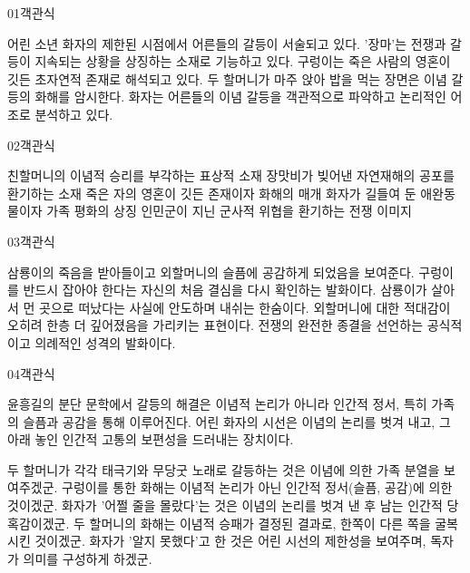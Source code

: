 \documentclass[fs85,seriesWit]{korfarm-base}
\begin{document}
\kfBeginMC
\begin{kfQBlock}{01}{객관식}
\begin{kfChoices}
\kfChoice 어린 소년 화자의 제한된 시점에서 어른들의 갈등이 서술되고 있다.
\kfChoice '장마'는 전쟁과 갈등이 지속되는 상황을 상징하는 소재로 기능하고 있다.
\kfChoice 구렁이는 죽은 사람의 영혼이 깃든 초자연적 존재로 해석되고 있다.
\kfChoice 두 할머니가 마주 앉아 밥을 먹는 장면은 이념 갈등의 화해를 암시한다.
\kfChoice 화자는 어른들의 이념 갈등을 객관적으로 파악하고 논리적인 어조로 분석하고 있다.
\end{kfChoices}
\end{kfQBlock}

\begin{kfQBlock}{02}{객관식}
\begin{kfChoices}
\kfChoice 친할머니의 이념적 승리를 부각하는 표상적 소재
\kfChoice 장맛비가 빚어낸 자연재해의 공포를 환기하는 소재
\kfChoice 죽은 자의 영혼이 깃든 존재이자 화해의 매개
\kfChoice 화자가 길들여 둔 애완동물이자 가족 평화의 상징
\kfChoice 인민군이 지닌 군사적 위협을 환기하는 전쟁 이미지
\end{kfChoices}
\end{kfQBlock}

\begin{kfQBlock}{03}{객관식}
\begin{kfChoices}
\kfChoice 삼룡이의 죽음을 받아들이고 외할머니의 슬픔에 공감하게 되었음을 보여준다.
\kfChoice 구렁이를 반드시 잡아야 한다는 자신의 처음 결심을 다시 확인하는 발화이다.
\kfChoice 삼룡이가 살아서 먼 곳으로 떠났다는 사실에 안도하며 내쉬는 한숨이다.
\kfChoice 외할머니에 대한 적대감이 오히려 한층 더 깊어졌음을 가리키는 표현이다.
\kfChoice 전쟁의 완전한 종결을 선언하는 공식적이고 의례적인 성격의 발화이다.
\end{kfChoices}
\end{kfQBlock}

\begin{kfQBlock}{04}{객관식}
\begin{kfEvidence}윤흥길의 분단 문학에서 갈등의 해결은 이념적 논리가 아니라 인간적 정서, 특히 가족의 슬픔과 공감을 통해 이루어진다. 어린 화자의 시선은 이념의 논리를 벗겨 내고, 그 아래 놓인 인간적 고통의 보편성을 드러내는 장치이다.\end{kfEvidence}
\begin{kfChoices}
\kfChoice 두 할머니가 각각 태극기와 무당굿 노래로 갈등하는 것은 이념에 의한 가족 분열을 보여주겠군.
\kfChoice 구렁이를 통한 화해는 이념적 논리가 아닌 인간적 정서(슬픔, 공감)에 의한 것이겠군.
\kfChoice 화자가 '어쩔 줄을 몰랐다'는 것은 이념의 논리를 벗겨 낸 후 남는 인간적 당혹감이겠군.
\kfChoice 두 할머니의 화해는 이념적 승패가 결정된 결과로, 한쪽이 다른 쪽을 굴복시킨 것이겠군.
\kfChoice 화자가 '알지 못했다'고 한 것은 어린 시선의 제한성을 보여주며, 독자가 의미를 구성하게 하겠군.
\end{kfChoices}
\end{kfQBlock}
\end{document}
